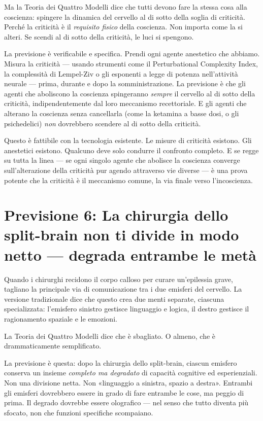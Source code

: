 \documentclass[11pt, twoside, openright]{book}
\begin{document}
Ma la Teoria dei Quattro Modelli dice che tutti devono fare la stessa cosa alla coscienza: spingere la dinamica del cervello al di sotto della soglia di criticità. Perché la criticità è il \textit{requisito fisico} della coscienza. Non importa come la si alteri. Se scendi al di sotto della criticità, le luci si spengono.

La previsione è verificabile e specifica. Prendi ogni agente anestetico che abbiamo. Misura la criticità --- usando strumenti come il Perturbational Complexity Index, la complessità di Lempel-Ziv o gli esponenti a legge di potenza nell'attività neurale --- prima, durante e dopo la somministrazione. La previsione è che gli agenti che aboliscono la coscienza spingeranno \textit{sempre} il cervello al di sotto della criticità, indipendentemente dal loro meccanismo recettoriale. E gli agenti che alterano la coscienza senza cancellarla (come la ketamina a basse dosi, o gli psichedelici) \textit{non} dovrebbero scendere al di sotto della criticità.

Questo è fattibile con la tecnologia esistente. Le misure di criticità esistono. Gli anestetici esistono. Qualcuno deve solo condurre il confronto completo. E se regge su tutta la linea --- se ogni singolo agente che abolisce la coscienza converge sull'alterazione della criticità pur agendo attraverso vie diverse --- è una prova potente che la criticità è il meccanismo comune, la via finale verso l'incoscienza.

\section*{Previsione 6: La chirurgia dello split-brain non ti divide in modo netto --- degrada entrambe le metà}

Quando i chirurghi recidono il corpo calloso per curare un'epilessia grave, tagliano la principale via di comunicazione tra i due emisferi del cervello. La versione tradizionale dice che questo crea due menti separate, ciascuna specializzata: l'emisfero sinistro gestisce linguaggio e logica, il destro gestisce il ragionamento spaziale e le emozioni.

La Teoria dei Quattro Modelli dice che è sbagliato. O almeno, che è drammaticamente semplificato.

La previsione è questa: dopo la chirurgia dello split-brain, ciascun emisfero conserva un insieme \textit{completo ma degradato} di capacità cognitive ed esperienziali. Non una divisione netta. Non «linguaggio a sinistra, spazio a destra». Entrambi gli emisferi dovrebbero essere in grado di fare entrambe le cose, ma peggio di prima. Il degrado dovrebbe essere olografico --- nel senso che tutto diventa più sfocato, non che funzioni specifiche scompaiano.
\end{document}
